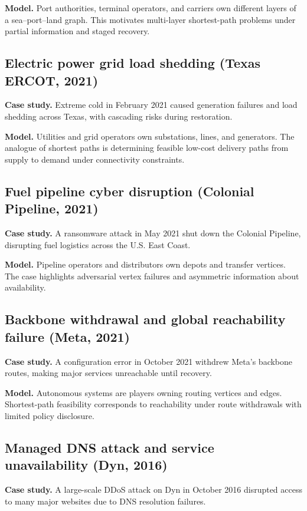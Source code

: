 \documentclass[11pt]{article}
\begin{document}
\textbf{Model.} Port authorities, terminal operators, and carriers own different layers of a sea--port--land graph. This motivates multi-layer shortest-path problems under partial information and staged recovery.

\subsection{Electric power grid load shedding (Texas ERCOT, 2021)}
\textbf{Case study.} Extreme cold in February 2021 caused generation failures and load shedding across Texas, with cascading risks during restoration. \cite{nerc2021cold,busby2021texas}

\textbf{Model.} Utilities and grid operators own substations, lines, and generators. The analogue of shortest paths is determining feasible low-cost delivery paths from supply to demand under connectivity constraints.

\subsection{Fuel pipeline cyber disruption (Colonial Pipeline, 2021)}
\textbf{Case study.} A ransomware attack in May 2021 shut down the Colonial Pipeline, disrupting fuel logistics across the U.S. East Coast. \cite{unece2023colonial,reedernhall2021colonial}

\textbf{Model.} Pipeline operators and distributors own depots and transfer vertices. The case highlights adversarial vertex failures and asymmetric information about availability.

\subsection{Backbone withdrawal and global reachability failure (Meta, 2021)}
\textbf{Case study.} A configuration error in October 2021 withdrew Meta's backbone routes, making major services unreachable until recovery. \cite{meta2021outage,cloudflare2021fb}

\textbf{Model.} Autonomous systems are players owning routing vertices and edges. Shortest-path feasibility corresponds to reachability under route withdrawals with limited policy disclosure.

\subsection{Managed DNS attack and service unavailability (Dyn, 2016)}
\textbf{Case study.} A large-scale DDoS attack on Dyn in October 2016 disrupted access to many major websites due to DNS resolution failures. \cite{wired2016dyn}
\end{document}
